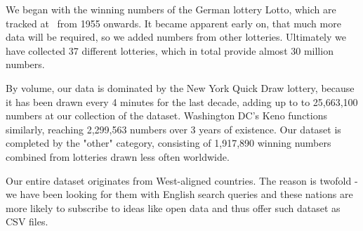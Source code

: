 We began with the winning numbers of the German lottery Lotto, which are tracked at~\cite{lottoarchive} from 1955 onwards.
It became apparent early on, that much more data will be required, so we added numbers from other lotteries. Ultimately
we have collected 37 different lotteries, which in total provide almost 30 million numbers.

By volume, our data is dominated by the New York Quick Draw lottery, because it has been drawn every 4 minutes
for the last decade, adding up to to 25,663,100 numbers at our collection of the dataset.
Washington DC's Keno functions similarly, reaching 2,299,563 numbers over 3 years of existence. Our dataset is completed by
the "other" category, consisting of 1,917,890 winning numbers combined from lotteries drawn less often worldwide.

Our entire dataset originates from West-aligned countries. The reason is twofold - we have been looking
for them with English search queries and these nations are more likely to subscribe to ideas like open data and thus
offer such dataset as CSV files.

